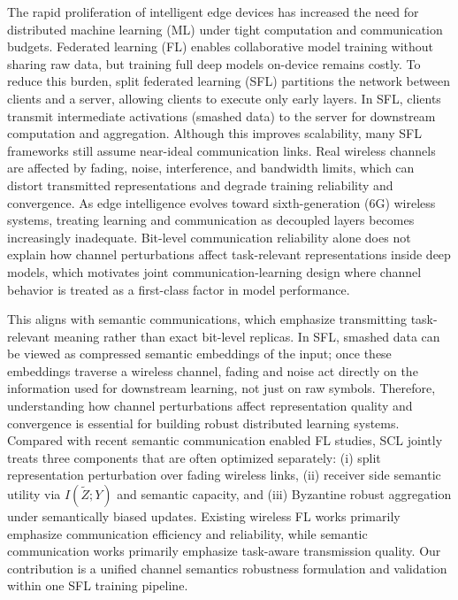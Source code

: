 \documentclass[10pt,journal]{IEEEtran}
\begin{document}
The rapid proliferation of intelligent edge devices has increased the need for distributed machine learning (ML) under tight computation and communication budgets\cite{8736011,8876870,9042352}. Federated learning (FL) enables collaborative model training without sharing raw data\cite{mcmahan2023communicationefficientlearningdeepnetworks,kairouz2021advancesopenproblemsfederated,9205981}, but training full deep models on-device remains costly. To reduce this burden, split federated learning (SFL) partitions the network between clients and a server, allowing clients to execute only early layers\cite{thapa2022splitfedfederatedlearningmeets,li2020federatedoptimizationheterogeneousnetworks,9060868,10255264}.
In SFL, clients transmit intermediate activations (smashed data) to the server for downstream computation and aggregation\cite{vepakomma2018splitlearninghealthdistributed}. Although this improves scalability, many SFL frameworks still assume near-ideal communication links\cite{10741277}. Real wireless channels are affected by fading, noise, interference, and bandwidth limits\cite{Goldsmith_2005,Tse_Viswanath_2005,9014530,11119144}, which can distort transmitted representations and degrade training reliability and convergence\cite{11134601}.
As edge intelligence evolves toward sixth-generation (6G) wireless systems, treating learning and communication as decoupled layers becomes increasingly inadequate\cite{8839651,8454325}. Bit-level communication reliability alone does not explain how channel perturbations affect task-relevant representations inside deep models, which motivates joint communication-learning design where channel behavior is treated as a first-class factor in model performance\cite{9398576,10183789}. 

This aligns with semantic communications, which emphasize transmitting task-relevant meaning rather than exact bit-level replicas\cite{9398576,2022arXiv220101389Q,8792135}. In SFL, smashed data can be viewed as compressed semantic embeddings of the input\cite{9398576}; once these embeddings traverse a wireless channel, fading and noise act directly on the information used for downstream learning, not just on raw symbols\cite{10798108}. Therefore, understanding how channel perturbations affect representation quality and convergence is essential for building robust distributed learning systems\cite{8839651}.
Compared with recent semantic communication enabled FL studies, SCL jointly treats three components that are often optimized separately: (i) split representation perturbation over fading wireless links, (ii) receiver side semantic utility via $I(\tilde{Z};Y)$ and semantic capacity, and (iii) Byzantine robust aggregation under semantically biased updates. Existing wireless FL works primarily emphasize communication efficiency and reliability\cite{8736011,11134601,11119144}, while semantic communication works primarily emphasize task-aware transmission quality\cite{9398576,10798108}. Our contribution is a unified channel semantics robustness formulation and validation within one SFL training pipeline\cite{10741277}.
\end{document}

